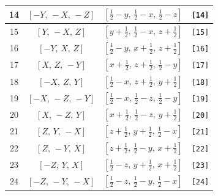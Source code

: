 \documentclass[fleqn,8pt]{jsarticle}
\begin{document}
\begin{longtable}{cccc}
14 & $\left[ - Y,\, - X,\, - Z \right]$ & $\left[ \frac{1}{2} - y,\, \frac{1}{2} - x,\, \frac{1}{2} - z \right]$ & {\tt [14]} \\ \hline
15 & $\left[ Y,\, - X,\, Z \right]$ & $\left[ y + \frac{1}{2},\, \frac{1}{2} - x,\, z + \frac{1}{2} \right]$ & {\tt [15]} \\ \hline
16 & $\left[ - Y,\, X,\, Z \right]$ & $\left[ \frac{1}{2} - y,\, x + \frac{1}{2},\, z + \frac{1}{2} \right]$ & {\tt [16]} \\ \hline
17 & $\left[ X,\, Z,\, - Y \right]$ & $\left[ x + \frac{1}{2},\, z + \frac{1}{2},\, \frac{1}{2} - y \right]$ & {\tt [17]} \\ \hline
18 & $\left[ - X,\, Z,\, Y \right]$ & $\left[ \frac{1}{2} - x,\, z + \frac{1}{2},\, y + \frac{1}{2} \right]$ & {\tt [18]} \\ \hline
19 & $\left[ - X,\, - Z,\, - Y \right]$ & $\left[ \frac{1}{2} - x,\, \frac{1}{2} - z,\, \frac{1}{2} - y \right]$ & {\tt [19]} \\ \hline
20 & $\left[ X,\, - Z,\, Y \right]$ & $\left[ x + \frac{1}{2},\, \frac{1}{2} - z,\, y + \frac{1}{2} \right]$ & {\tt [20]} \\ \hline
21 & $\left[ Z,\, Y,\, - X \right]$ & $\left[ z + \frac{1}{2},\, y + \frac{1}{2},\, \frac{1}{2} - x \right]$ & {\tt [21]} \\ \hline
22 & $\left[ Z,\, - Y,\, X \right]$ & $\left[ z + \frac{1}{2},\, \frac{1}{2} - y,\, x + \frac{1}{2} \right]$ & {\tt [22]} \\ \hline
23 & $\left[ - Z,\, Y,\, X \right]$ & $\left[ \frac{1}{2} - z,\, y + \frac{1}{2},\, x + \frac{1}{2} \right]$ & {\tt [23]} \\ \hline
24 & $\left[ - Z,\, - Y,\, - X \right]$ & $\left[ \frac{1}{2} - z,\, \frac{1}{2} - y,\, \frac{1}{2} - x \right]$ & {\tt [24]} \\
\end{longtable}
\end{document}
